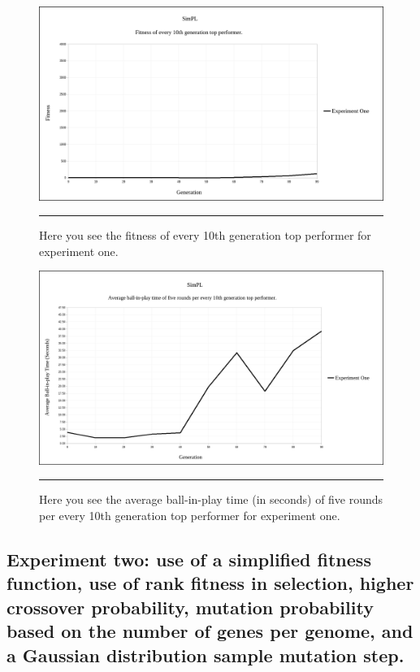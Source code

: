 \begin{figure}[htbp]  
  \centering
  \includegraphics[width=5in]{../Figures/Chapter3/exp1_10_tops.png}
  \rule{35em}{0.5pt}
  \caption[Experiment One Top Performers]{Here you see the fitness of every 10th generation top performer for experiment one.}
  \label{fig:exp1_10_tops}
\end{figure}

\begin{figure}[htbp]  
  \centering
  \includegraphics[width=5in]{../Figures/Chapter3/exp1_10_tops_times.png}
  \rule{35em}{0.5pt}
  \caption[Experiment One Top Performers Tournament]{Here you see the average ball-in-play time (in seconds) of five rounds per every 10th generation top performer for experiment one.}
  \label{fig:exp1_10_tops_times}
\end{figure}

\subsection[Experiment Two]{Experiment two: use of a simplified fitness function, use of rank fitness in selection, higher crossover probability, mutation probability based on the number of genes per genome, and a Gaussian distribution sample mutation step.}

